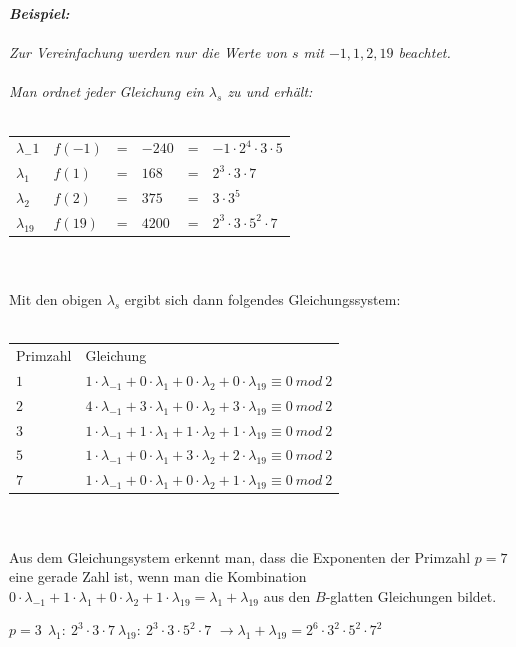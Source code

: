 \documentclass[a4paper,11pt]{article}
\begin{document}
{\it
\textbf{Beispiel:}\\\\
Zur Vereinfachung werden nur die Werte von $s$ mit $-1, 1, 2, 19$ beachtet.\\\\
Man ordnet jeder Gleichung ein $\lambda_s$ zu und erhält:\\\\
\begin{tabular}{llllll}
$\lambda_-1$ & $f(-1)$ & = & $-240$ & = & $-1\cdot2^4\cdot3\cdot5$\\
$\lambda_1$ & $f(1)$ & = & $168 $ & = & $ 2^3\cdot3\cdot7$\\
$\lambda_2$ & $f(2)$ & = & $ 375 $ & = & $ 3\cdot3^5$\\
$\lambda_19$ & $f(19) $ & = & $ 4200 $ & = & $2^3\cdot3\cdot5^2\cdot7$\\
\end{tabular}\\\\
Mit den obigen $\lambda_s$ ergibt sich dann folgendes
Gleichungssystem:\\\\
\begin{tabular}{ll}
Primzahl & Gleichung\\
$1$ & $1\cdot \lambda_{-1}+0\cdot \lambda_{1} +0\cdot \lambda_{2} + 0\cdot \lambda_{19} \equiv 0\ mod\ 2  $\\
$2$ & $4\cdot \lambda_{-1}+3\cdot \lambda_{1} +0\cdot \lambda_{2} + 3\cdot \lambda_{19} \equiv 0\ mod\ 2  $\\
$3$ & $1\cdot \lambda_{-1}+1\cdot \lambda_{1} +1\cdot \lambda_{2} + 1\cdot \lambda_{19} \equiv 0\ mod\ 2  $\\
$5$ & $1\cdot \lambda_{-1}+0\cdot \lambda_{1} +3\cdot \lambda_{2} + 2\cdot \lambda_{19} \equiv 0\ mod\ 2  $\\
$7$ & $1\cdot \lambda_{-1}+0\cdot \lambda_{1} +0\cdot \lambda_{2} + 1\cdot \lambda_{19} \equiv 0\ mod\ 2  $\\
\end{tabular}\\\\
Aus dem Gleichungsystem erkennt man, dass die Exponenten der Primzahl $p=7$ eine
gerade Zahl ist, wenn man die Kombination
$0\cdot \lambda_{-1}+1\cdot \lambda_{1} +0\cdot
\lambda_{2} + 1\cdot \lambda_{19} = \lambda_{1} + \lambda_{19}$
aus den $B$-glatten Gleichungen bildet.
\begin{center}
$p=3\ \ \lambda_1:\ 2^3\cdot3\cdot7\
\lambda_{19}:\ 2^3\cdot3\cdot5^2\cdot7$ $\rightarrow
\lambda_{1} + \lambda_{19} = 2^6\cdot3^2\cdot5^2\cdot7^2$
\end{center}
}
\end{document}
